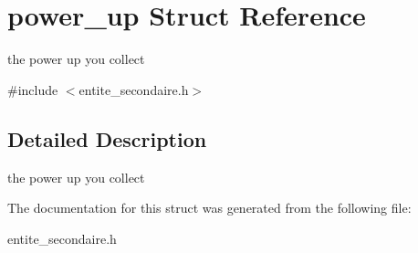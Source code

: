\hypertarget{structpower__up}{}\section{power\+\_\+up Struct Reference}
\label{structpower__up}


the power up you collect  




{\ttfamily \#include $<$entite\+\_\+secondaire.\+h$>$}



\subsection{Detailed Description}
the power up you collect 

The documentation for this struct was generated from the following file\+:\begin{DoxyCompactItemize}
\item 
entite\+\_\+secondaire.\+h\end{DoxyCompactItemize}
